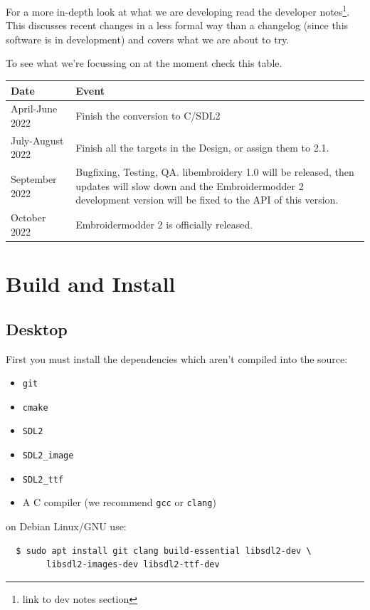 \documentclass[a4paper, 11pt]{report}
\begin{document}
For a more in-depth look at what we are developing read
the developer notes\footnote{link to dev notes section}.
This discusses recent changes in a less formal way than a
changelog (since this software is in
development) and covers what we are about to try.

To see what we're focussing on at the moment check this table.

\begin{tabular}{l l}
\textbf{Date} & \textbf{Event} \\
\hline
April-June 2022 & Finish the conversion to C/SDL2 \\
July-August 2022 & Finish all the targets in the Design, or assign them to 2.1. \\
September 2022 & Bugfixing, Testing, QA. libembroidery 1.0 will be released, then updates will slow down and the Embroidermodder 2 development version will be fixed to the API of this version. \\
October 2022 & Embroidermodder 2 is officially released.
\end{tabular}

\section{Build and Install}

\subsection{Desktop}

First you must install the dependencies which aren't compiled into the source:

\begin{itemize}
\item \texttt{git}
\item \texttt{cmake}
\item \texttt{SDL2}
\item \texttt{SDL2\_image}
\item \texttt{SDL2\_ttf}
\item A C compiler (we recommend \texttt{gcc} or \texttt{clang})
\end{itemize}

on Debian Linux/GNU use:

\begin{verbatim}
  $ sudo apt install git clang build-essential libsdl2-dev \
        libsdl2-images-dev libsdl2-ttf-dev
\end{verbatim}
\end{document}
